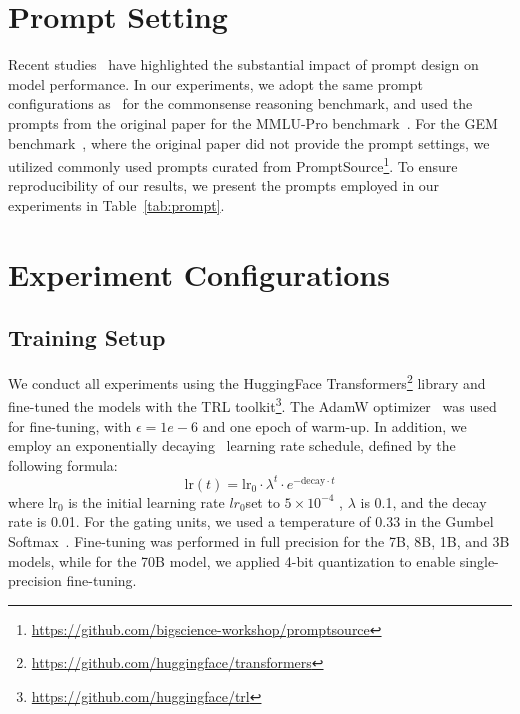 


\section{Prompt Setting}
\label{appendix:prompt}
Recent studies~\cite{he2024does,lai-etal-2024-llms} have highlighted the substantial impact of prompt design on model performance.
In our experiments, we adopt the same prompt configurations as~\citet{hu-etal-2023-llm} for the commonsense reasoning benchmark, and used the prompts from the original paper for the MMLU-Pro benchmark~\cite{wang2024mmlu}.
For the GEM benchmark~\cite{gehrmann-etal-2022-gemv2}, where the original paper did not provide the prompt settings, we utilized commonly used prompts curated from PromptSource\footnote{\url{https://github.com/bigscience-workshop/promptsource}}.
To ensure reproducibility of our results, we present the prompts employed in our experiments in Table~\ref{tab:prompt}.

\section{Experiment Configurations}
\label{appendix:exp_config}
\subsection{Training Setup}
\label{appendix:traiing_config}
We conduct all experiments using the HuggingFace Transformers\footnote{\url{https://github.com/huggingface/transformers}} library and fine-tuned the models with the TRL toolkit\footnote{\url{https://github.com/huggingface/trl}}.
The AdamW optimizer~\cite{loshchilov2017decoupled} was used for fine-tuning, with $\epsilon = 1e-6$ and one epoch of warm-up.
In addition, we employ an exponentially decaying~\cite{li2019exponential} learning rate schedule, defined by the following formula:
\begin{equation}
    \text{lr}(t) = \text{lr}_0 \cdot \lambda^{t} \cdot e^{-\text{decay} \cdot t}
\end{equation}
where $\text{lr}_0$ is the initial learning rate $lr_{0}$set to $5 \times 10^{-4}$ , $\lambda$ is 0.1, and the decay rate is 0.01.
For the gating units, we used a temperature of 0.33 in the Gumbel Softmax~\cite{jang2017categorical}.
Fine-tuning was performed in full precision for the 7B, 8B, 1B, and 3B models, while for the 70B model, we applied 4-bit quantization to enable single-precision fine-tuning.

